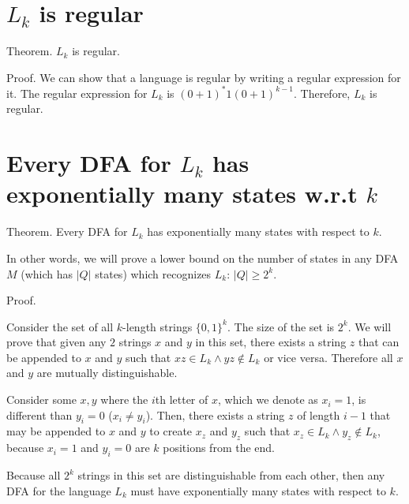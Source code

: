 \documentclass[11pt,addpoints,answers]{exam}
\newcommand{\1}{\mathbf{1}}
\begin{document}
\pagestyle{head}                %

\medskip
 
\section{$L_k$ is regular}

\noindent Theorem. $L_k$ is regular.

\medskip

\noindent Proof. We can show that a language is regular by writing a regular expression for it. The regular expression for $L_k$ is $(0 + 1)^* 1 (0 + 1)^{k-1}$. Therefore, $L_k$ is regular.

\section{Every DFA for $L_k$ has exponentially many states w.r.t $k$}

\noindent Theorem. Every DFA for $L_k$ has exponentially many states with respect to $k$.

\medskip

\noindent In other words, we will prove a lower bound on the number of states in any DFA $M$ (which has $|Q|$ states) which recognizes $L_k$: $|Q| \geq 2^k$.

\medskip

\noindent Proof.

\noindent Consider the set of all $k$-length strings $\{0, 1\}^k$. The size of the set is $2^k$. We will prove that given any $2$ strings $x$ and $y$ in this set, there exists a string $z$ that can be appended to $x$ and $y$ such that $xz \in L_k \wedge yz \notin L_k$ or vice versa. Therefore all $x$ and $y$ are mutually distinguishable.

\medskip

\noindent Consider some $x, y$ where the $i$th letter of $x$, which we denote as $x_i=1$, is different than $y_i=0$ ($x_i \neq y_i$). Then, there exists a string $z$ of length $i-1$ that may be appended to $x$ and $y$ to create $x_z$ and $y_z$ such that $x_z \in L_k \wedge y_z \notin L_k$, because $x_i=1$ and $y_i=0$ are $k$ positions from the end.

\medskip

\noindent Because all $2^k$ strings in this set are distinguishable from each other, then any DFA for the language $L_k$ must have exponentially many states with respect to $k$.
\end{document}
